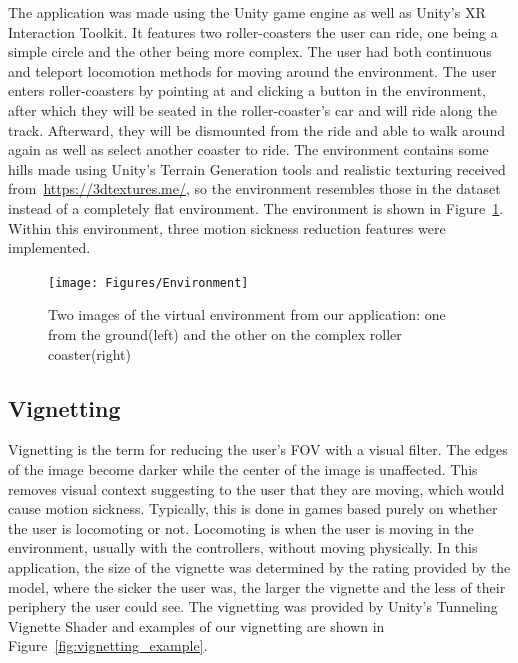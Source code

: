 The application was made using the Unity game engine as well as Unity's XR Interaction Toolkit\cite{InteractionToolkit}.
It features two roller-coasters the user can ride, one being a simple circle and the other being more complex.
The user had both continuous and teleport locomotion methods for moving around the environment.
The user enters roller-coasters by pointing at and clicking a button in the environment, after which they will be seated in the roller-coaster's car and will ride along the track.
Afterward, they will be dismounted from the ride and able to walk around again as well as select another coaster to ride.
The environment contains some hills made using Unity's Terrain Generation tools and realistic texturing received from~\url{https://3dtextures.me/}\cite{3dtextures.me}, so the environment resembles those in the dataset instead of a completely flat environment.
The environment is shown in Figure~\ref{fig:environment_images}.
Within this environment, three motion sickness reduction features were implemented.

\begin{figure}[h!]
    \texttt{[image: Figures/Environment]}
    \centering
    \caption{Two images of the virtual environment from our application: one from the ground(left) and the other on the complex roller coaster(right)}
    \label{fig:environment_images}
\end{figure}

\subsection{Vignetting}
\label{subsec:vignetting}

Vignetting is the term for reducing the user's FOV with a visual filter.
The edges of the image become darker while the center of the image is unaffected.
This removes visual context suggesting to the user that they are moving, which would cause motion sickness.
Typically, this is done in games based purely on whether the user is locomoting or not.
Locomoting is when the user is moving in the environment, usually with the controllers, without moving physically.
In this application, the size of the vignette was determined by the rating provided by the model, where the sicker the user was, the larger the vignette and the less of their periphery the user could see.
The vignetting was provided by Unity's Tunneling Vignette Shader\cite{TunnelingVignette} and examples of our vignetting are shown in Figure~\ref{fig:vignetting_example}.

